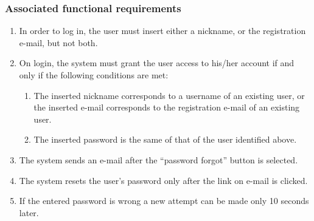 \subsubsection{Associated functional requirements}
\begin{enumerate}
    \item In order to log in, the user must insert either a nickname, or the registration e-mail, but not both.
    \item On login, the system must grant the user access to his/her account if and only if the following conditions are met:
    \begin{enumerate} 
    	\item The inserted nickname corresponds to a username of an existing user, or the inserted e-mail corresponds to the registration e-mail of an existing user.
	\item The inserted password is the same of that of the user identified above.
    \end{enumerate}
    \item The system sends an e-mail after the ``password forgot'' button is selected.
    \item The system resets the user's password only after the link on e-mail is clicked.
    \item If the entered password is wrong a new attempt can be made only 10 seconds later.
  
\end{enumerate}